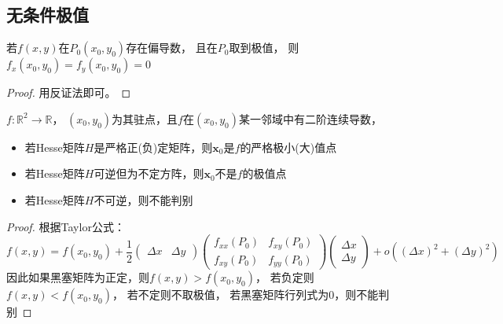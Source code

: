\subsection{无条件极值}

\begin{theorem}[极值点必要条件]
  若$f(x,y)$在$P_0(x_0,y_0)$存在偏导数，
  且在$P_0$取到极值，
  则$f_x(x_0,y_0) = f_y(x_0,y_0) = 0$
\end{theorem}

\begin{proof}
  用反证法即可。
\end{proof}

\begin{theorem}[极值点充分条件]
  $f:\mathbb{R}^2 \rightarrow \mathbb{R}$，
  $(x_0,y_0)$为其驻点，且$f$在$(x_0,y_0)$某一邻域中有二阶连续导数，
  \begin{itemize}
  \item 若Hesse矩阵$H$是严格正(负)定矩阵，则$\mathbf{x}_0$是$f$的严格极小(大)值点
  \item 若Hesse矩阵$H$可逆但为不定方阵，则$\mathbf{x}_0$不是$f$的极值点
  \item 若Hesse矩阵$H$不可逆，则不能判别
  \end{itemize}
\end{theorem}

\begin{proof}
  根据Taylor公式：
  \begin{equation*}
    f(x,y) = f(x_0,y_0) + \frac{1}{2} \left(
      \begin{array}{cc}
        \Delta x&\Delta y
      \end{array} 
    \right) \left(
      \begin{array}{cc}
        f_{xx}(P_0)&f_{xy}(P_0)\\
        f_{xy}(P_0)& f_{yy}(P_0)
      \end{array}
    \right) \left(
      \begin{array}{c}
        \Delta x\\
        \Delta y
      \end{array}
    \right) + o((\Delta x)^2 + (\Delta y)^2)
  \end{equation*}
  因此如果黑塞矩阵为正定，则$f(x,y) > f(x_0,y_0)$，
  若负定则$f(x,y) < f(x_0,y_0)$，
  若不定则不取极值，
  若黑塞矩阵行列式为$0$，则不能判别
\end{proof}

